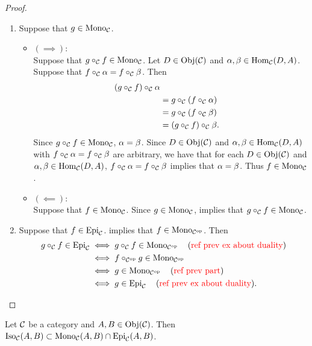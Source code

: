 \documentclass{book}
\begin{document}
	\begin{proof}\
		\begin{enumerate}
			\item Suppose that $g \in \operatorname{Mono}_{\mathcal{C}}$. 
			\begin{itemize}
				\item $(\implies)$: \\
				Suppose that $g \circ_{\mathcal{C}} f \in \operatorname{Mono}_{\mathcal{C}}$. Let $D \in \operatorname{Obj}(\mathcal{C})$ and $\alpha,\beta \in \operatorname{Hom}_{\mathcal{C}}(D, A)$. Suppose that $f \circ_{\mathcal{C}} \alpha = f \circ_{\mathcal{C}} \beta$. Then 
				\begin{align*}
					(g \circ_{\mathcal{C}} f) \circ_{\mathcal{C}} \alpha \\
					& = g \circ_{\mathcal{C}} (f \circ_{\mathcal{C}} \alpha) \\
					& = g \circ_{\mathcal{C}} (f \circ_{\mathcal{C}} \beta) \\
					& = (g \circ_{\mathcal{C}} f) \circ_{\mathcal{C}} \beta.
				\end{align*}
				Since $g \circ_{\mathcal{C}} f \in \operatorname{Mono}_{\mathcal{C}}$, $\alpha = \beta$. Since $D \in \operatorname{Obj}(\mathcal{C})$ and $\alpha,\beta \in \operatorname{Hom}_{\mathcal{C}}(D, A)$ with $f \circ_{\mathcal{C}} \alpha = f \circ_{\mathcal{C}} \beta$ are arbitrary, we have that for each $D \in \operatorname{Obj}(\mathcal{C})$ and $\alpha,\beta \in \operatorname{Hom}_{\mathcal{C}}(D, A)$, $f \circ_{\mathcal{C}} \alpha = f \circ_{\mathcal{C}} \beta$ implies that $\alpha = \beta$. Thus $f \in \operatorname{Mono}_{\mathcal{C}}$.
				\item $(\impliedby)$: \\
				Suppose that $f \in \operatorname{Mono}_{\mathcal{C}}$. Since $g \in \operatorname{Mono}_{\mathcal{C}}$, \rex{}  implies that $g \circ_{\mathcal{C}} f \in \operatorname{Mono}_{\mathcal{C}}$.
			\end{itemize}
			\item Suppose that $f \in \operatorname{Epi}_{\mathcal{C}}$. \rex{}  implies that $f \in \operatorname{Mono}_{{\mathcal{C}}^{\text{op}}}$. Then
			\begin{align*}
				g \circ_{\mathcal{C}} f \in \operatorname{Epi}_{\mathcal{C}}
				& \iff g \circ_{\mathcal{C}} f \in \operatorname{Mono}_{{\mathcal{C}}^{\text{op}}} \quad \text{(\textcolor{red}{ref prev ex about duality})} \\
				& \iff f \circ_{{\mathcal{C}}^{\text{op}}} g \in \operatorname{Mono}_{{\mathcal{C}}^{\text{op}}} \\
				& \iff g \in \operatorname{Mono}_{{\mathcal{C}}^{\text{op}}} \quad \text{(\textcolor{red}{ref prev part})} \\
				& \iff g \in \operatorname{Epi}_{\mathcal{C}} \quad \text{(\textcolor{red}{ref prev ex about duality})}.
			\end{align*}
		\end{enumerate}
	\end{proof}
	
	\begin{ex} 
		Let $\mathcal{C}$ be a category and $A,B \in \operatorname{Obj}(\mathcal{C})$. Then $\operatorname{Iso}_{\mathcal{C}}(A, B) \subset \operatorname{Mono}_{\mathcal{C}}(A, B) \cap \operatorname{Epi}_{\mathcal{C}}(A, B)$. 
	\end{ex}
	
\end{document}
